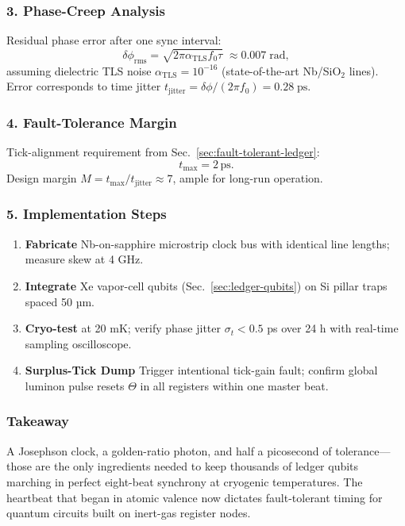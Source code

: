 \documentclass[11pt,oneside]{book}
\begin{document}
\subsubsection*{3. Phase-Creep Analysis}

Residual phase error after one sync interval:
\[
   \delta\phi_{\text{rms}}
   = \sqrt{2\pi \alpha_{\text{TLS}} f_0 \tau}\;
     \approx 0.007\;\text{rad},
\]
assuming dielectric TLS noise
\(\alpha_{\text{TLS}}=10^{-16}\) (state-of-the-art Nb/SiO\(_2\) lines).  
Error corresponds to time jitter
\(t_{\text{jitter}} = \delta\phi/(2\pi f_0) = 0.28\;\text{ps}\).

\subsubsection*{4. Fault-Tolerance Margin}

Tick-alignment requirement from Sec.~\ref{sec:fault-tolerant-ledger}:
\[
   t_{\text{max}} = 2\,\text{ps}.
\]
Design margin
\(M = t_{\text{max}}/t_{\text{jitter}} \approx 7\),  
ample for long-run operation.

\subsubsection*{5. Implementation Steps}

\begin{enumerate}[label=\textbf{\arabic*.},leftmargin=1.2cm]
\item \textbf{Fabricate} Nb-on-sapphire microstrip clock bus with
      identical line lengths; measure skew at 4 GHz.
\item \textbf{Integrate} Xe vapor-cell qubits (Sec.~\ref{sec:ledger-qubits})
      on Si pillar traps spaced 50 µm.
\item \textbf{Cryo-test} at 20 mK; verify phase jitter  
      $\sigma_t <0.5$ ps over 24 h with real-time sampling oscilloscope.
\item \textbf{Surplus-Tick Dump}  
      Trigger intentional tick-gain fault; confirm global luminon pulse
      resets $\Theta$ in all registers within one master beat.
\end{enumerate}

\subsubsection*{Takeaway}

A Josephson clock, a golden-ratio photon, and half a picosecond of
tolerance—those are the only ingredients needed to keep thousands of
ledger qubits marching in perfect eight-beat synchrony at cryogenic
temperatures.
The heartbeat that began in atomic valence now dictates fault-tolerant
timing for quantum circuits built on inert-gas register nodes.
\end{document}
